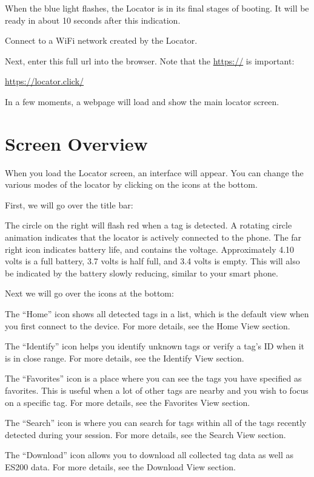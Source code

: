 \documentclass[
]{article}
\begin{document}
When the blue light flashes, the Locator is in its final stages of
booting. It will be ready in about 10 seconds after this indication.

Connect to a WiFi network created by the Locator.

Next, enter this full url into the browser. Note that the \url{https://}
is important:

\url{https://locator.click/}

In a few moments, a webpage will load and show the main locator screen.

\hypertarget{screen-overview}{%
\section{Screen Overview}\label{screen-overview}}

When you load the Locator screen, an interface will appear. You can
change the various modes of the locator by clicking on the icons at the
bottom.

First, we will go over the title bar:

The circle on the right will flash red when a tag is detected. A
rotating circle animation indicates that the locator is actively
connected to the phone. The far right icon indicates battery life, and
contains the voltage. Approximately 4.10 volts is a full battery, 3.7
volts is half full, and 3.4 volts is empty. This will also be indicated
by the battery slowly reducing, similar to your smart phone.

Next we will go over the icons at the bottom:

The ``Home'' icon shows all detected tags in a list, which is the
default view when you first connect to the device. For more details, see
the Home View section.

The ``Identify'' icon helps you identify unknown tags or verify a tag's
ID when it is in close range. For more details, see the Identify View
section.

The ``Favorites'' icon is a place where you can see the tags you have
specified as favorites. This is useful when a lot of other tags are
nearby and you wish to focus on a specific tag. For more details, see
the Favorites View section.

The ``Search'' icon is where you can search for tags within all of the
tags recently detected during your session. For more details, see the
Search View section.

The ``Download'' icon allows you to download all collected tag data as
well as ES200 data. For more details, see the Download View section.
\end{document}
